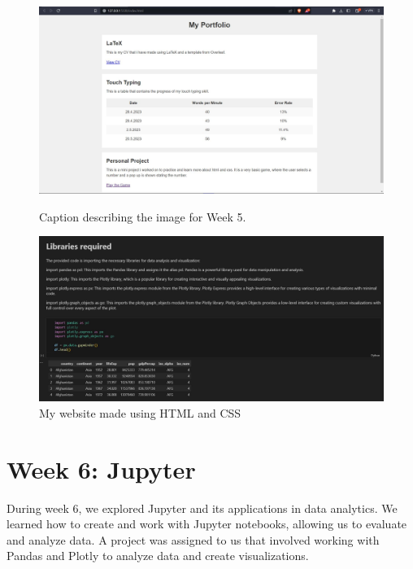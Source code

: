 \documentclass{article}
\begin{document}
\begin{figure}[ht]
  \centering
  \begin{minipage}{0.45\textwidth}
    \centering
    \includegraphics[width=\textwidth]{website ss}
    \caption{Caption describing the image for Week 5.}
    \label{fig:week5_image}
  \end{minipage}\hfill
  \begin{minipage}{0.45\textwidth}
    \centering
    \includegraphics[width=\textwidth]{JH pt1}
    \caption{My website made using HTML and CSS}
    \label{fig:week5_mini_project_image}
  \end{minipage}
\end{figure}
  

\section{Week 6: Jupyter}
During week 6, we explored Jupyter and its applications in data analytics. We learned how to create and work with Jupyter notebooks, allowing us to evaluate and analyze data. A project was assigned to us that involved working with Pandas and Plotly to analyze data and create visualizations.
\end{document}
